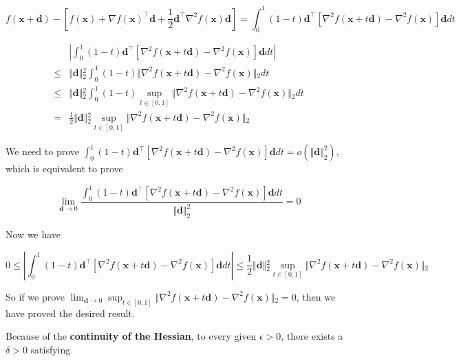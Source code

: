 \documentclass[10pt,a4paper]{article}
\begin{document}
\begin{enumerate}
\begin{enumerate}
        $$
        f(\mathbf{x} + \mathbf{d}) - \left[ f(\mathbf{x}) + \nabla f(\mathbf{x})^\top \mathbf{d} + \frac{1}{2}\mathbf{d}^\top \nabla^2 f(\mathbf{x})\mathbf{d} \right]
        =
        \int_0^1 (1 - t) \mathbf{d}^\top \left[ \nabla^2 f(\mathbf{x} + t\mathbf{d}) - \nabla^2 f(\mathbf{x}) \right] \mathbf{d} dt
        $$

        $$
        \begin{aligned}
        &\left\vert{} \int_0^1 (1 - t)\mathbf{d}^\top \left[ \nabla^2 f(\mathbf{x} + t\mathbf{d}) - \nabla^2 f(\mathbf{x}) \right]\mathbf{d} dt \right\vert{}
        \\
        \leq &
        \Vert{}\mathbf{d}\Vert{}_2^2 \int_0^1 (1 - t) \Vert{}\nabla^2 f(\mathbf{x} + t\mathbf{d}) - \nabla^2 f(\mathbf{x})\Vert{}_2 dt
        \\
        \leq &
        \Vert{}\mathbf{d}\Vert{}_2^2 \int_0^1 (1-t) \sup_{t\in[0,1]} \Vert{}\nabla^2 f(\mathbf{x} + t\mathbf{d}) - \nabla^2 f(\mathbf{x})\Vert{}_2 dt
        \\
        =&
        \frac12 \Vert{}\mathbf{d}\Vert{}_2^2 \sup_{t\in[0,1]} \Vert{}\nabla^2 f(\mathbf{x} + t\mathbf{d}) - \nabla^2 f(\mathbf{x})\Vert{}_2
        \end{aligned}
        $$

        We need to prove $\int_0^1 (1 - t) \mathbf{d}^\top \left[ \nabla^2 f(\mathbf{x} + t\mathbf{d}) - \nabla^2 f(\mathbf{x}) \right] \mathbf{d} dt = o(\Vert \mathbf{d} \Vert_2^2 )$, which is equivalent to prove

        $$
        \lim_{\mathbf{d} \to 0} \frac{\int_0^1 (1 - t) \mathbf{d}^\top \left[ \nabla^2 f(\mathbf{x} + t\mathbf{d}) - \nabla^2 f(\mathbf{x}) \right] \mathbf{d} dt}{\Vert \mathbf{d} \Vert_2^2} = 0
        $$

        Now we have 

        $$
        0
        \leq
        \left\vert{} \int_0^1 (1 - t)\mathbf{d}^\top \left[ \nabla^2 f(\mathbf{x} + t\mathbf{d}) - \nabla^2 f(\mathbf{x}) \right]\mathbf{d} dt \right\vert{}
        \leq
        \frac12 \Vert{}\mathbf{d}\Vert{}_2^2 \sup_{t\in[0,1]} \Vert{}\nabla^2 f(\mathbf{x} + t\mathbf{d}) - \nabla^2 f(\mathbf{x})\Vert{}_2
        $$

        So if we prove $\lim_{\mathbf{d} \to 0} \sup_{t\in[0,1]} \Vert{}\nabla^2 f(\mathbf{x} + t\mathbf{d}) - \nabla^2 f(\mathbf{x})\Vert{}_2 = 0$, then we have proved the desired result.

        Because of the \textbf{continuity of the Hessian}, to every given $\epsilon > 0$, there exists a $\delta > 0$ satisfying
        

\end{enumerate}
\end{enumerate}
\end{document}
